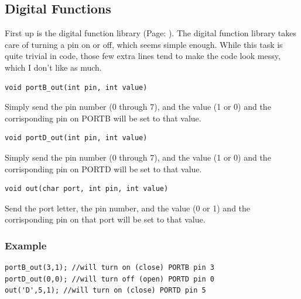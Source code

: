 \documentclass{article}
\begin{document}
\subsection{Digital Functions}
First up is the digital function library (Page: \pageref{digital}). The digital function library takes care of turning a pin on or off, which seems simple enough. While this task is quite trivial in code, those few extra lines tend to make the code look messy, which I don't like as much.\\
\begin{verbatim}void portB_out(int pin, int value)\end{verbatim}
Simply send the pin number (0 through 7), and the value (1 or 0) and the corrisponding pin on PORTB will be set to that value.\\
\begin{verbatim}void portD_out(int pin, int value)\end{verbatim}
Simply send the pin number (0 through 7), and the value (1 or 0) and the corrisponding pin on PORTD will be set to that value.\\
\begin{verbatim}void out(char port, int pin, int value)\end{verbatim}
Send the port letter, the pin number, and the value (0 or 1) and the corrisponding pin on that port will be set to that value.\\
\subsubsection{Example}
\begin{lstlisting}[caption={Digital examples},label=digitalex,frame=bl]
portB_out(3,1); //will turn on (close) PORTB pin 3
portD_out(0,0); //will turn off (open) PORTD pin 0
out('D',5,1); //will turn on (close) PORTD pin 5
\end{lstlisting}
\end{document}
